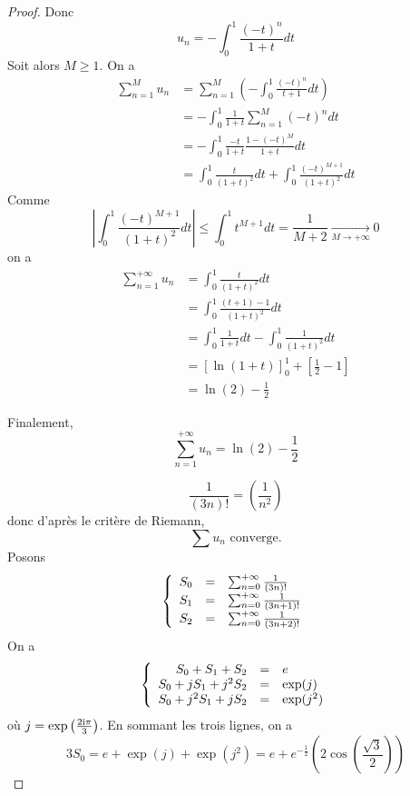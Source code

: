 \begin{proof}
	Donc 
	$$u_{n}=-\int_{0}^{1}\frac{(-t)^{n}}{1+t}dt$$
	Soit alors $M\geqslant1$. On a 
	\begin{align*}
		\sum_{n=1}^{M}u_{n}
		&=\sum_{n=1}^{M}\left(-\int_{0}^{1}\frac{(-t)^{n}}{t+1}dt\right)\\
		&=-\int_{0}^{1}\frac{1}{1+t}\sum_{n=1}^{M}(-t)^{n}dt\\
		&=-\int_{0}^{1}\frac{-t}{1+t}\frac{1-(-t)^{M}}{1+t}dt\\
		&=\int_{0}^{1}\frac{t}{(1+t)^{2}}dt+\int_{0}^{1}\frac{(-t)^{M+1}}{(1+t)^{2}}dt
	\end{align*}
	Comme 
	$$\left\vert\int_{0}^{1}\frac{(-t)^{M+1}}{(1+t)^{2}}dt\right\vert\leqslant\int_{0}^{1}t^{M+1}dt=\frac{1}{M+2}\xrightarrow[M\to+\infty]{}0$$
	on a 
	\begin{align*}
		\sum_{n=1}^{+\infty}u_{n}
		&=\int_{0}^{1}\frac{t}{(1+t)^{2}}dt\\
		&=\int_{0}^{1}\frac{(t+1)-1}{(1+t)^{2}}dt\\
		&=\int_{0}^{1}\frac{1}{1+t}dt-\int_{0}^{1}\frac{1}{(1+t)^{2}}dt\\
		&=\left[\ln\left(1+t\right)\right]_{0}^{1}+\left[\frac{1}{2}-1\right]\\
		&=\ln(2)-\frac{1}{2}
	\end{align*}

	Finalement, 
	$$\boxed{\sum_{n=1}^{+\infty} u_{n}=\ln(2)-\frac{1}{2}}$$

	\item $$\frac{1}{(3n)!}=\left(\frac{1}{n^{2}}\right)$$
	donc d'après le critère de Riemann, 
	$$\boxed{\sum u_{n}\text{ converge.}}$$
	Posons 
	$$
	\left\{
		\begin{array}[]{rcl}
			S_{0} &= &\sum_{n=0}^{+\infty}\frac{1}{(3n)!}\\
			S_{1} &= &\sum_{n=0}^{+\infty}\frac{1}{(3n+1)!}\\
			S_{2} &= &\sum_{n=0}^{+\infty}\frac{1}{(3n+2)!}
		\end{array}
	\right.
	$$
	On a 
	$$
	\left\{
		\begin{array}[]{rcl}
			S_{0} + S_{1} + S_{2} &= & e\\
			S_{0} + jS_{1} + j^{2}S_{2} &= &\exp(j)\\
			S_{0} + j^{2}S_{1} + jS_{2} &= &\exp(j^{2})
		\end{array}
	\right.
	$$
	où $j=\exp\left(\frac{2\mathrm{i} \pi}{3}\right)$.
	En sommant les trois lignes, on a 
	$$3S_{0}=e+\exp(j)+\exp(j^{2})=e+e^{-\frac{1}{2}}\left(2\cos\left(\frac{\sqrt{3}}{2}\right)\right)$$


\end{proof}
